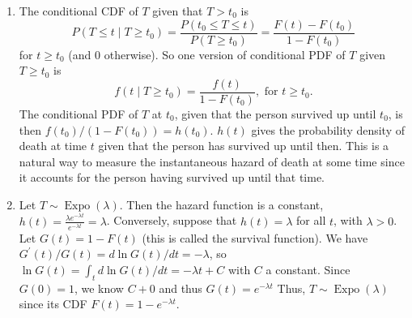 

\setcounter{theorem}{45}
\begin{exercise}[BH.5.46]
\begin{solution}
    \begin{enumerate}
        \item The conditional CDF of $T$ given that $T>t_0$ is
        $$
        P\left(T \leq t \mid T \geq t_0\right)=\frac{P\left(t_0 \leq T \leq t\right)}{P\left(T \geq t_0\right)}=\frac{F(t)-F\left(t_0\right)}{1-F\left(t_0\right)}
        $$
        for $t \geq t_0$ (and 0 otherwise). So one version of conditional PDF of $T$ given $T \geq t_0$ is
        $$
        f\left(t \mid T \geq t_0\right)=\frac{f(t)}{1-F\left(t_0\right)}, \text { for } t \geq t_0 .
        $$
        The conditional PDF of $T$ at $t_0$, given that the person survived up until $t_0$, is then $f\left(t_0\right) /\left(1-F\left(t_0\right)\right)=h\left(t_0\right)$. $h(t)$ gives the probability density of death at time $t$ given that the person has survived up until then. This is a natural way to measure the instantaneous hazard of death at some time since it accounts for the person having survived up until that time.
        \item Let $T \sim \operatorname{Expo}(\lambda)$. Then the hazard function is  a constant, $h(t)=\frac{\lambda e^{-\lambda t}}{e^{-\lambda t}}=\lambda$. Conversely, suppose that $h(t)=\lambda$ for all $t$, with $\lambda >0$. Let $ G(t)=1-F(t)$ (this is called the survival function). We have $G^{\prime}(t) / G(t)=d\ln G(t)/dt=-\lambda$, so $\ln G(t)=\int_t d\ln G(t)/dt ={-\lambda t+C}$ with $C$ a constant. Since $G(0)=1$, we know $C+0$ and thus $G(t) =e^{-\lambda t}$ Thus, $T \sim \operatorname{Expo}(\lambda)$ since its CDF $F(t)=1-e^{-\lambda t}$.
    \end{enumerate}
\end{solution}
\end{exercise}



